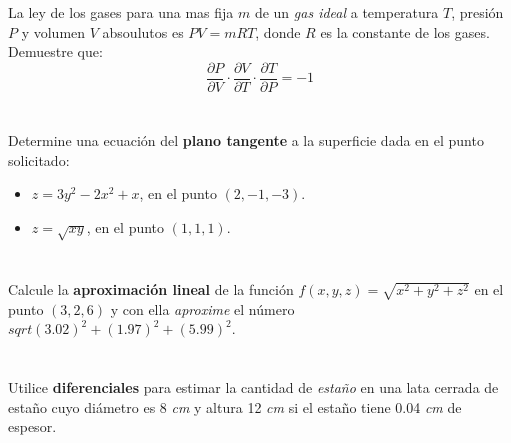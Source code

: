 \documentclass[12pt]{article}
\begin{document}
\section{}

La ley de los gases para una mas fija $m$ de un \textit{gas ideal} a temperatura $T$, presión $P$ y volumen $V$ absoulutos es $P V = mRT$, donde $R$ es la constante de los gases. Demuestre que:
$$\frac{∂P}{∂V} \cdot \frac{∂V}{∂T} \cdot \frac{∂T}{∂P} = −1$$

\section{}

Determine una ecuación del \textbf{plano tangente} a la superficie dada en el punto solicitado:

\begin{itemize}[format=\textbf]

\item $z=3y^2-2x^2+x$, en el punto $(2,-1,-3)$.

\item $z=\sqrt{xy}$, en el punto $(1,1,1)$.

\end{itemize}

\section{}

Calcule la \textbf{aproximación lineal} de la función $f(x,y,z)=\sqrt{x^2+y^2+z^2}$ en el punto $(3,2,6)$ y con ella \textit{aproxime} el número $sqrt{(3.02)^2+(1.97)^2+(5.99)^2}$.

\section{}

Utilice \textbf{diferenciales} para estimar la cantidad de \textit{estaño} en una lata cerrada de estaño cuyo diámetro es 8 \textit{cm} y altura 12 \textit{cm} si el estaño tiene
0.04 \textit{cm} de espesor.
\end{document}
